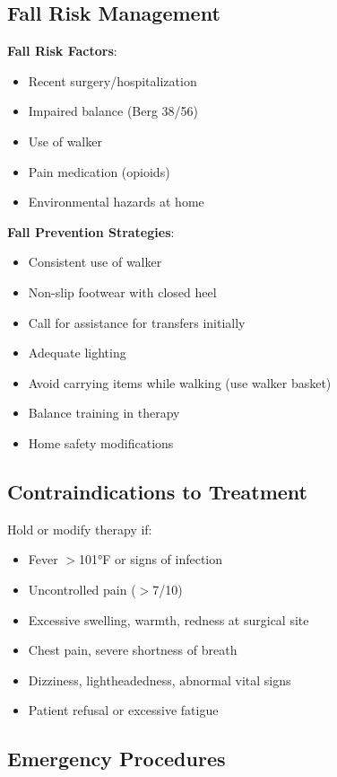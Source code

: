 \documentclass[11pt,letterpaper]{article}
\begin{document}
\subsection*{Fall Risk Management}

\textbf{Fall Risk Factors}:
\begin{itemize}[leftmargin=*]
    \item Recent surgery/hospitalization
    \item Impaired balance (Berg 38/56)
    \item Use of walker
    \item Pain medication (opioids)
    \item Environmental hazards at home
\end{itemize}

\textbf{Fall Prevention Strategies}:
\begin{itemize}[leftmargin=*]
    \item Consistent use of walker
    \item Non-slip footwear with closed heel
    \item Call for assistance for transfers initially
    \item Adequate lighting
    \item Avoid carrying items while walking (use walker basket)
    \item Balance training in therapy
    \item Home safety modifications
\end{itemize}

\subsection*{Contraindications to Treatment}

Hold or modify therapy if:
\begin{itemize}[leftmargin=*]
    \item Fever $>$101°F or signs of infection
    \item Uncontrolled pain ($>$7/10)
    \item Excessive swelling, warmth, redness at surgical site
    \item Chest pain, severe shortness of breath
    \item Dizziness, lightheadedness, abnormal vital signs
    \item Patient refusal or excessive fatigue
\end{itemize}

\subsection*{Emergency Procedures}
\end{document}

